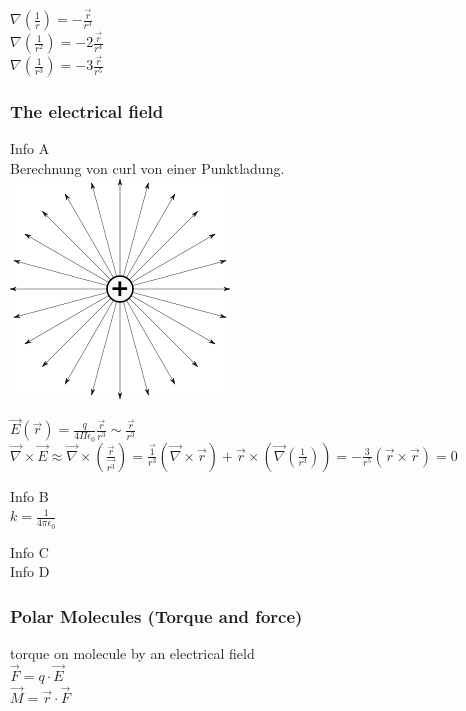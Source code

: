 \documentclass[a4paper]{scrartcl}
\begin{document}
$ \nabla(\frac{1}{r}) = -\frac{\vec{r}}{r^3}$
\\
$ \nabla(\frac{1}{r^2}) = -2\frac{\vec{r}}{r^4}$
\\
$ \nabla(\frac{1}{r^3}) = -3\frac{\vec{r}}{r^5}$

\subsubsection{The electrical field}

Info A\\
Berechnung von curl von einer Punktladung.\\ \includegraphics[scale=0.2]{images/punktladung.png}
\label{fig:Punktladung}

$ \vec{E}(\vec{r})=\frac{q}{4\Pi\epsilon_0}\frac{\vec{r}}{r^3}\sim \frac{\vec{r}}{r^3} $
\\
$ \vec{\nabla}\times\vec{E}\approx\vec{\nabla}\times(\frac{\vec{r}}{\vec{r^3}})=\frac{\vec{1}}{r^3}(\vec{\nabla}\times\vec{r})+\vec{r}\times(\vec{\nabla}(\frac{1}{r^3}))=-\frac{3}{r^5}(\vec{r}\times\vec{r})=0 $

Info B\\
$ k=\frac{1}{4\pi\epsilon_0} $

Info C\\


Info D\\

\subsubsection{Polar Molecules (Torque and force)}

torque on molecule by an electrical field\\

$ \vec{F}=q\cdot\vec{E}$\\

$ \vec{M}=\vec{r}\cdot\vec{F}$\\
\end{document}
